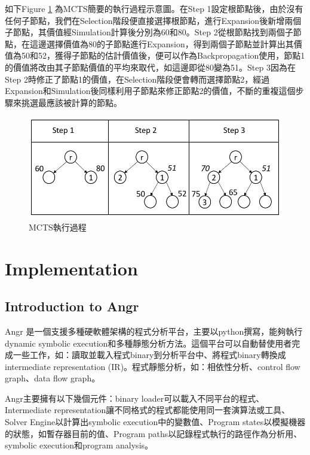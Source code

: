\documentclass[12pt,a4paper,oneside]{book}
\begin{document}
如下Figure \ref{figStep} 為MCTS簡要的執行過程示意圖。在Step 1設定根節點後，由於沒有任何子節點，我們在Selection階段便直接選擇根節點，進行Expansion後新增兩個子節點，其價值經Simulation計算後分別為60和80。Step 2從根節點找到兩個子節點，在這邊選擇價值為80的子節點進行Expansion，得到兩個子節點並計算出其價值為50和52，獲得子節點的估計價值後，便可以作為Backpropagation使用，節點1的價值將改由其子節點價值的平均來取代，如這邊即從80變為51。Step 3因為在Step 2時修正了節點1的價值，在Selection階段便會轉而選擇節點2，經過Expansion和Simulation後同樣利用子節點來修正節點2的價值，不斷的重複這個步驟來挑選最應該被計算的節點。

\begin{figure}[htbp]
\center
\includegraphics[width=\textwidth]{figures/step.PNG}
\caption{MCTS執行過程 \label{figStep}}
\end{figure}

\chapter{Implementation}

\section{Introduction to Angr}

Angr\cite{angr} 是一個支援多種硬軟體架構的程式分析平台，主要以python撰寫，能夠執行dynamic symbolic execution和多種靜態分析方法。這個平台可以自動替使用者完成一些工作，如：讀取並載入程式binary到分析平台中、將程式binary轉換成intermediate representation (IR)。程式靜態分析，如：相依性分析、control flow graph、data flow graph。

Angr主要擁有以下幾個元件：binary loader可以載入不同平台的程式、Intermediate representation讓不同格式的程式都能使用同一套演算法或工具、Solver Engine以計算出symbolic execution中的變數值、Program states以模擬機器的狀態，如暫存器目前的值、Program paths以記錄程式執行的路徑作為分析用、symbolic execution和program analysis。
\end{document}

